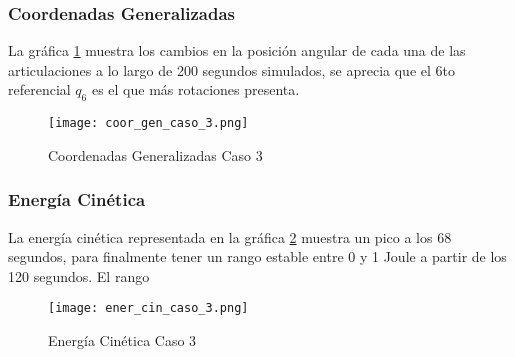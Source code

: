     \begin{table}[H]%
        \centering
        \begin{center}
        \caption{Parámetros modificados del simulador (Sistema Conservativo)} 
        \centering
        \bigskip
        \end{center}
        \label{ref:TablaC3}
    \end{table}

    \subsubsection{Coordenadas Generalizadas}

    La gráfica \ref{fig:CoordGenC3} muestra los cambios en la posición angular de cada una de las articulaciones a lo largo de 200 segundos simulados, se aprecia que el 6to referencial $q_6$ es el que más rotaciones presenta.

    \begin{figure} [H]%
            \centering
            \texttt{[image: coor\_gen\_caso\_3.png]} 
        \caption{Coordenadas Generalizadas Caso 3}
        \label{fig:CoordGenC3}
    \end{figure}

    \subsubsection{Energía Cinética}

    La energía cinética representada en la gráfica \ref{fig:eCinC3} muestra un pico a los 68 segundos, para finalmente tener un rango estable entre 0 y 1 Joule a partir de los 120 segundos. El rango 

    \begin{figure} [H]%
            \centering
            \texttt{[image: ener\_cin\_caso\_3.png]} 
        \caption{Energía Cinética Caso 3}
        \label{fig:eCinC3}
    \end{figure}

